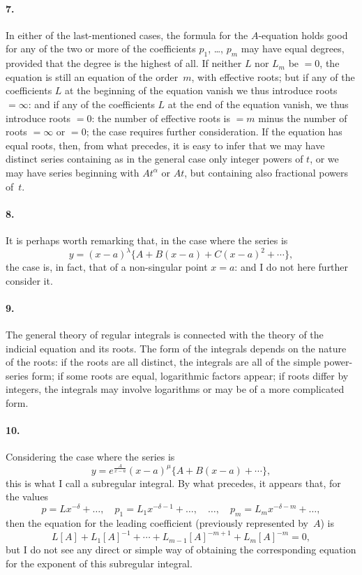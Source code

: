 \documentclass[11pt,a4paper]{book}
\begin{document}
\paragraph{7.} In either of the last-mentioned cases, the formula for the $A$-equation holds good for any of the two or more of the coefficients $p_{1}$, \ldots, $p_{m}$ may have equal degrees, provided that the degree is the highest of all. If neither $L$ nor $L_{m}$ be $=0$, the equation is still an equation of the order~$m$, with effective roots; but if any of the coefficients $L$ at the beginning of the equation vanish we thus introduce roots $= \infty$: and if any of the coefficients $L$ at the end of the equation vanish, we thus introduce roots $= 0$: the number of effective roots is $= m$ minus the number of roots $= \infty$ or $=0$; the case requires further consideration. If the equation has equal roots, then, from what precedes, it is easy to infer that we may have distinct series containing as in the general case only integer powers of $t$, or we may have series beginning with $At^{\alpha}$ or $At$, but containing also fractional powers of~$t$.

\paragraph{8.} It is perhaps worth remarking that, in the case where the series is
\[
y = (x - a)^{\lambda}\{A + B(x - a) + C(x - a)^{2} + \cdots\},
\]
the case is, in fact, that of a non-singular point $x = a$: and I do not here further consider it.

\paragraph{9.} The general theory of regular integrals is connected with the theory of the indicial equation and its roots. The form of the integrals depends on the nature of the roots: if the roots are all distinct, the integrals are all of the simple power-series form; if some roots are equal, logarithmic factors appear; if roots differ by integers, the integrals may involve logarithms or may be of a more complicated form.

\paragraph{10.} Considering the case where the series is
\[
y = e^{\frac{A}{x-a}}(x - a)^{\mu}\{A + B(x - a) + \cdots\},
\]
this is what I call a subregular integral. By what precedes, it appears that, for the values
\[
p = Lx^{-\delta} + \ldots, \quad p_{1} = L_{1}x^{-\delta-1} + \ldots, \quad \ldots, \quad p_{m} = L_{m}x^{-\delta-m} + \ldots,
\]
then the equation for the leading coefficient (previously represented by~$A$) is
\[
L[A] + L_{1}[A]^{-1} + \cdots + L_{m-1}[A]^{-m+1} + L_{m}[A]^{-m} = 0,
\]
but I do not see any direct or simple way of obtaining the corresponding equation for the exponent of this subregular integral.
\end{document}
